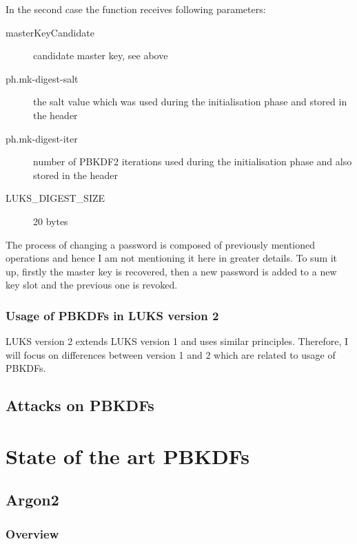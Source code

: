 \documentclass[nolof]{fithesis3}
\begin{document}
In the second case the function receives following parameters:

\begin{description}
\item[masterKeyCandidate] candidate master key, see above

\item[ph.mk-digest-salt] the salt value which was used during the initialisation phase and stored in the header

\item[ph.mk-digest-iter] number of PBKDF2 iterations used during the initialisation phase and also stored in the header

\item[LUKS\_DIGEST\_SIZE] 20 bytes
\end{description}

The process of changing a password is composed of previously mentioned operations and hence I am not mentioning it here in greater details. To sum it up, firstly the master key is recovered, then a new password is added to a new key slot and the previous one is revoked.

\subsection{Usage of PBKDFs in LUKS version 2}
LUKS version 2 extends LUKS version 1 and uses similar principles. Therefore, I will focus on differences between version 1 and 2 which are related to usage of PBKDFs.



\section{Attacks on PBKDFs}
\label{sec:attacks}



\chapter{State of the art PBKDFs}
\label{chap:pbkdfs}

\section{Argon2}

\subsection{Overview}
\end{document}
